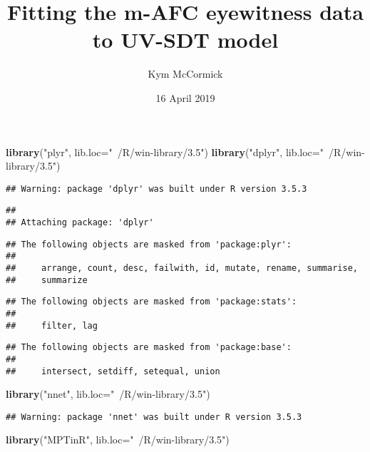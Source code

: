 \documentclass[]{article}
\title{Fitting the m-AFC eyewitness data to UV-SDT model}
\author{Kym McCormick}
\date{16 April 2019}
\newenvironment{Shaded}{\begin{snugshade}}{\end{snugshade}}
\newcommand{\KeywordTok}[1]{\textcolor[rgb]{0.13,0.29,0.53}{\textbf{#1}}}
\newcommand{\DataTypeTok}[1]{\textcolor[rgb]{0.13,0.29,0.53}{#1}}
\newcommand{\StringTok}[1]{\textcolor[rgb]{0.31,0.60,0.02}{#1}}
\newcommand{\NormalTok}[1]{#1}
\begin{document}
\maketitle

\begin{Shaded}
\begin{Highlighting}[]
\KeywordTok{library}\NormalTok{(}\StringTok{"plyr"}\NormalTok{, }\DataTypeTok{lib.loc=}\StringTok{"~/R/win-library/3.5"}\NormalTok{)}
\KeywordTok{library}\NormalTok{(}\StringTok{"dplyr"}\NormalTok{, }\DataTypeTok{lib.loc=}\StringTok{"~/R/win-library/3.5"}\NormalTok{)}
\end{Highlighting}
\end{Shaded}

\begin{verbatim}
## Warning: package 'dplyr' was built under R version 3.5.3
\end{verbatim}

\begin{verbatim}
## 
## Attaching package: 'dplyr'
\end{verbatim}

\begin{verbatim}
## The following objects are masked from 'package:plyr':
## 
##     arrange, count, desc, failwith, id, mutate, rename, summarise,
##     summarize
\end{verbatim}

\begin{verbatim}
## The following objects are masked from 'package:stats':
## 
##     filter, lag
\end{verbatim}

\begin{verbatim}
## The following objects are masked from 'package:base':
## 
##     intersect, setdiff, setequal, union
\end{verbatim}

\begin{Shaded}
\begin{Highlighting}[]
\KeywordTok{library}\NormalTok{(}\StringTok{"nnet"}\NormalTok{, }\DataTypeTok{lib.loc=}\StringTok{"~/R/win-library/3.5"}\NormalTok{)}
\end{Highlighting}
\end{Shaded}

\begin{verbatim}
## Warning: package 'nnet' was built under R version 3.5.3
\end{verbatim}

\begin{Shaded}
\begin{Highlighting}[]
\KeywordTok{library}\NormalTok{(}\StringTok{"MPTinR"}\NormalTok{, }\DataTypeTok{lib.loc=}\StringTok{"~/R/win-library/3.5"}\NormalTok{)}
\end{Highlighting}
\end{Shaded}
\end{document}
